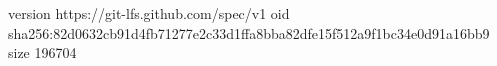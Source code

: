 version https://git-lfs.github.com/spec/v1
oid sha256:82d0632cb91d4fb71277e2c33d1ffa8bba82dfe15f512a9f1bc34e0d91a16bb9
size 196704
